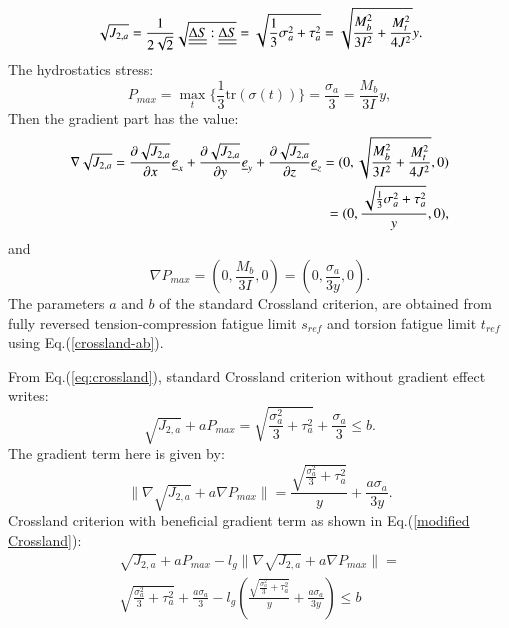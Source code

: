 \documentclass[3p,times,procedia,number]{elsarticle}
\begin{document}
\begin{equation}
\sqrt{J_{2,a}}=\frac{1}{2\sqrt{2}}\sqrt{\uline{\uline{\Delta S}}:\uline{\uline{\Delta S}}}=\sqrt{\frac{1}{3}\sigma_a^2+\tau_a^2}=\sqrt{\frac{M_b^2}{3I^2}+\frac{M_t^2}{4J^2}}y.
\end{equation}
The hydrostatics stress:
\begin{equation}
P_{max}=\max\limits_{t}\{\frac{1}{3}\textrm{tr}(\sigma(t))\}=\frac{\sigma_{a}}{3}=\frac{M_b}{3I}y ,
\end{equation}
Then the gradient part has the value:
\begin{equation}
\begin{split}
\nabla\sqrt{J_{2,a}}=\frac{\partial\sqrt{J_{2,a}}}{\partial x}\uline{e}_x+\frac{\partial\sqrt{J_{2,a}}}{\partial y}\uline{e}_y+\frac{\partial\sqrt{J_{2,a}}}{\partial z}\uline{e}_z=(0,\sqrt{\frac{M_b^2}{3I^2}+\frac{M_t^2}{4J^2}},0)\\=(0,\frac{\sqrt{\frac{1}{3}\sigma_a^2+\tau_a^2}}{y},0) ,
\end{split}
\end{equation}
and
\begin{equation}
\nabla P_{max}=(0,\frac{M_b}{3I},0)=(0,\frac{\sigma_a}{3y},0).
\end{equation}
The parameters $a$ and $b$ of the standard Crossland criterion, are obtained from fully reversed tension-compression fatigue limit $s_{ref}$  and torsion fatigue limit $t_{ref}$ using Eq.(\ref{crossland-ab}).

\noindent From Eq.(\ref{eq:crossland}), standard Crossland criterion without gradient effect writes:
\begin{equation}
\sqrt{J_{2,a}}+aP_{max}=\sqrt{\frac{\sigma_a^2}{3}+\tau_a^2}+\frac{\sigma_a}{3}\leqslant b.
\label{eqrbcross}
\end{equation}
The gradient term here is given by:
\begin{equation}
\parallel{\nabla\sqrt{J_{2,a}}}+a{\nabla P_{max}}\parallel= \frac{\sqrt{\frac{\sigma_a^2}{3}+\tau_a^2}}{y}+\frac{a\sigma_a}{3y}.
\end{equation}
Crossland criterion with beneficial gradient term as shown in Eq.(\ref{modified Crossland}):
\begin{equation}
\begin{split}
\sqrt{J_{2,a}}+aP_{max}-l_g\parallel{\nabla\sqrt{J_{2,a}}}+a\nabla{P_{max}}\parallel=\\\sqrt{\frac{\sigma_a^2}{3}+\tau_a^2}+\frac{a\sigma_a}{3}-l_g(\frac{\sqrt{\frac{\sigma_a^2}{3}+\tau_a^2}}{y}+\frac{a\sigma_a}{3y})\leqslant b
\end{split}
\end{equation}
\end{document}
